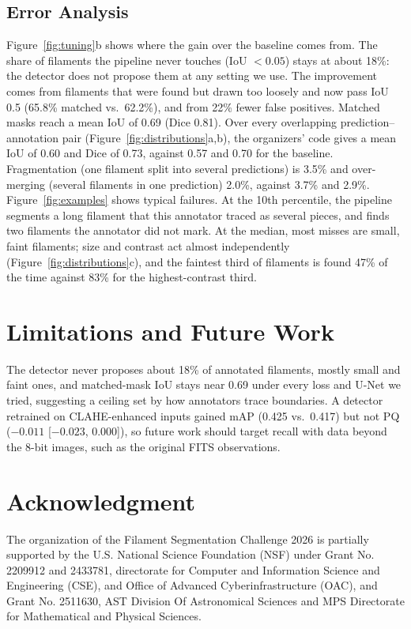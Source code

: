 \documentclass[sigconf]{acmart}
\begin{document}
\subsection{Error Analysis}\label{sec:errors}
    Figure~\ref{fig:tuning}b shows where the gain over the baseline comes from. The share of filaments the pipeline never touches (IoU $<0.05$) stays at about 18\%: the detector does not propose them at any setting we use. The improvement comes from filaments that were found but drawn too loosely and now pass IoU 0.5 (65.8\% matched vs.\ 62.2\%), and from 22\% fewer false positives. Matched masks reach a mean IoU of 0.69 (Dice 0.81). Over every overlapping prediction--annotation pair (Figure~\ref{fig:distributions}a,b), the organizers' code gives a mean IoU of 0.60 and Dice of 0.73, against 0.57 and 0.70 for the baseline. Fragmentation (one filament split into several predictions) is 3.5\% and over-merging (several filaments in one prediction) 2.0\%, against 3.7\% and 2.9\%. Figure~\ref{fig:examples} shows typical failures. At the 10th percentile, the pipeline segments a long filament that this annotator traced as several pieces, and finds two filaments the annotator did not mark. At the median, most misses are small, faint filaments; size and contrast act almost independently (Figure~\ref{fig:distributions}c), and the faintest third of filaments is found 47\% of the time against 83\% for the highest-contrast third.

\section{Limitations and Future Work}
The detector never proposes about 18\% of annotated filaments, mostly small and faint ones, and matched-mask IoU stays near 0.69 under every loss and U-Net we tried, suggesting a ceiling set by how annotators trace boundaries. A detector retrained on CLAHE-enhanced inputs gained mAP (0.425 vs.\ 0.417) but not PQ ($-0.011$ [$-0.023$, $0.000$]), so future work should target recall with data beyond the 8-bit images, such as the original FITS observations.

\section{Acknowledgment}\label{sec:acknowledgment}
    The organization of the Filament Segmentation Challenge 2026 is partially supported by the U.S. National Science Foundation (NSF) under Grant No. 2209912 and 2433781, directorate for Computer and Information Science and Engineering (CSE), and Office of Advanced Cyberinfrastructure (OAC), and Grant No. 2511630, AST Division Of Astronomical Sciences and MPS Directorate for Mathematical and Physical Sciences.
\end{document}
